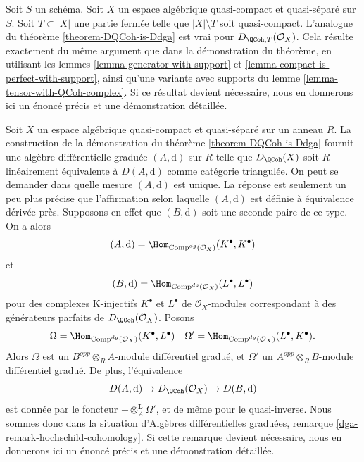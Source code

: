 \begin{remark}
\label{remark-DQCoh-is-Ddga-with-support}
Soit $S$ un sch\'ema. Soit $X$ un espace alg\'ebrique quasi-compact et
quasi-s\'epar\'e sur $S$. Soit $T\subset|X|$ une partie ferm\'ee telle que
$|X|\setminus T$ soit quasi-compact. L'analogue du th\'eor\`eme
\ref{theorem-DQCoh-is-Ddga} est vrai pour
$D_{\QCoh,T}(\mathcal{O}_X)$. Cela r\'esulte exactement du m\^eme argument que
dans la d\'emonstration du th\'eor\`eme, en utilisant les lemmes
\ref{lemma-generator-with-support} et
\ref{lemma-compact-is-perfect-with-support}, ainsi qu'une variante avec
supports du lemme \ref{lemma-tensor-with-QCoh-complex}. Si ce r\'esultat devient
n\'ecessaire, nous en donnerons ici un \'enonc\'e pr\'ecis et une d\'emonstration
d\'etaill\'ee.
\end{remark}

\begin{remark}
\label{remark-independence-choice}
Soit $X$ un espace alg\'ebrique quasi-compact et quasi-s\'epar\'e sur un anneau
$R$. La construction de la d\'emonstration du th\'eor\`eme
\ref{theorem-DQCoh-is-Ddga} fournit une alg\`ebre diff\'erentielle gradu\'ee
$(A,\text{d})$ sur $R$ telle que $D_\QCoh(X)$ soit $R$-lin\'eairement
\'equivalente \`a $D(A,\text{d})$ comme cat\'egorie triangul\'ee. On peut se
demander dans quelle mesure $(A,\text{d})$ est unique. La r\'eponse est
seulement un peu plus pr\'ecise que l'affirmation selon laquelle
$(A,\text{d})$ est d\'efinie \`a \'equivalence d\'eriv\'ee pr\`es. Supposons en
effet que $(B,\text{d})$ soit une seconde paire de ce type. On a alors
$$
(A, \text{d}) = \Hom_{\text{Comp}^{dg}(\mathcal{O}_X)}(K^\bullet, K^\bullet)
$$
et
$$
(B, \text{d}) = \Hom_{\text{Comp}^{dg}(\mathcal{O}_X)}(L^\bullet, L^\bullet)
$$
pour des complexes K-injectifs $K^\bullet$ et $L^\bullet$ de
$\mathcal{O}_X$-modules correspondant \`a des g\'en\'erateurs parfaits de
$D_\QCoh(\mathcal{O}_X)$. Posons
$$
\Omega = \Hom_{\text{Comp}^{dg}(\mathcal{O}_X)}(K^\bullet, L^\bullet)
\quad
\Omega' = \Hom_{\text{Comp}^{dg}(\mathcal{O}_X)}(L^\bullet, K^\bullet).
$$
Alors $\Omega$ est un $B^{opp}\otimes_RA$-module diff\'erentiel gradu\'e, et
$\Omega'$ un $A^{opp}\otimes_RB$-module diff\'erentiel gradu\'e. De plus,
l'\'equivalence
$$
D(A, \text{d}) \to D_\QCoh(\mathcal{O}_X) \to
D(B, \text{d})
$$
est donn\'ee par le foncteur $-\otimes_A^\mathbf{L}\Omega'$, et de m\^eme pour
le quasi-inverse. Nous sommes donc dans la situation d'Alg\`ebres
diff\'erentielles gradu\'ees, remarque
\ref{dga-remark-hochschild-cohomology}. Si cette remarque devient n\'ecessaire,
nous en donnerons ici un \'enonc\'e pr\'ecis et une d\'emonstration d\'etaill\'ee.
\end{remark}

